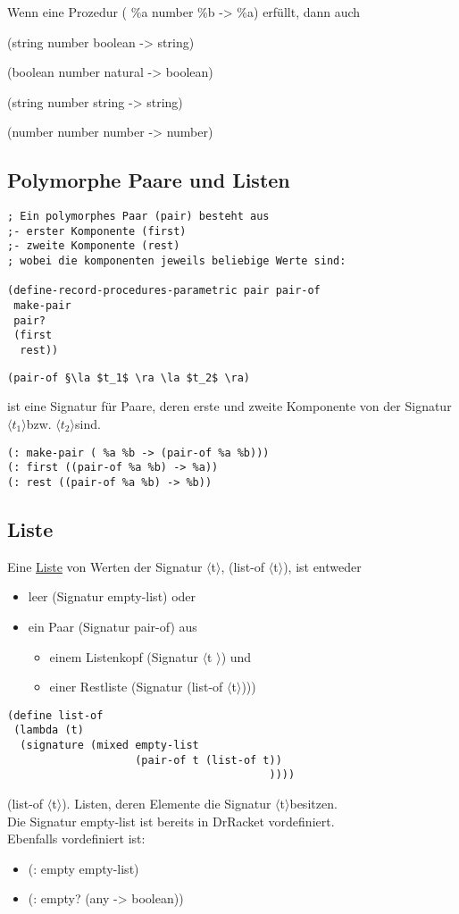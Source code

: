 \documentclass[a4paper,12pt]{article}
\newcommand{\la}{$\langle$}
\newcommand{\ra}{$\rangle$}
\begin{document}
Wenn eine Prozedur ( \%a number  \%b -> \%a) erfüllt, dann auch 

(string number boolean -> string)

(boolean number natural -> boolean)

(string number string -> string)

(number number number -> number)
\newpage
\subsection{Polymorphe Paare und Listen}
\begin{lstlisting}[style=customc]
; Ein polymorphes Paar (pair) besteht aus
;- erster Komponente (first)
;- zweite Komponente (rest)
; wobei die komponenten jeweils beliebige Werte sind:

(define-record-procedures-parametric pair pair-of
 make-pair
 pair?
 (first
  rest))
\end{lstlisting}


\begin{lstlisting}
(pair-of §\la $t_1$ \ra \la $t_2$ \ra)
\end{lstlisting}
ist eine Signatur für Paare, deren erste und zweite Komponente von der Signatur \la $t_1$\ra bzw. \la $t_2$\ra sind.
\begin{lstlisting}[style=customc]
(: make-pair ( %a %b -> (pair-of %a %b)))
(: first ((pair-of %a %b) -> %a))
(: rest ((pair-of %a %b) -> %b))
\end{lstlisting}
\subsection{Liste}
Eine \uline{Liste} von Werten der Signatur \la t\ra, (list-of \la t\ra), ist entweder
\begin{itemize}
\item leer (Signatur empty-list) oder
\item ein Paar (Signatur pair-of) aus 
\begin{itemize}
\item einem Listenkopf (Signatur \la t \ra) und
\item einer Restliste (Signatur (list-of \la t\ra)))
\end{itemize}
\end{itemize}
\begin{lstlisting}[style=customc]
(define list-of
 (lambda (t)
  (signature (mixed empty-list
                    (pair-of t (list-of t))
                                         ))))
\end{lstlisting}
(list-of \la t\ra). Listen, deren Elemente die Signatur \la t\ra besitzen.\\
Die Signatur empty-list ist bereits in DrRacket vordefiniert. \\Ebenfalls vordefiniert ist:
\begin{itemize}[-]
\item (: empty empty-list)
\item (: empty? (any -> boolean))
\end{itemize}
\end{document}
